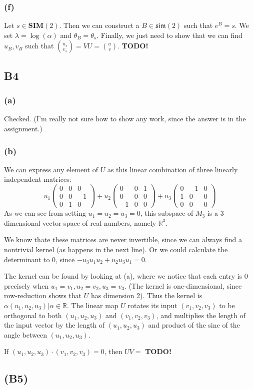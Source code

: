 \documentclass{article}
\newcommand{\reals}{\mathbb{R}}
\newcommand{\threematrix}[9]{\left(\begin{array}{ccc} #1 & #2 & #3\\ #4 & #5 & #6 \\ #7 & #8 & #9 \end{array}\right)}
\begin{document}
\subsubsection{(f)}
Let $s \in \textbf{SIM}(2)$. Then we can construct a $B \in \mathfrak{sim}(2)$ such that $e^B = s$.
We set $\lambda = \log(\alpha)$ and $\theta_B = \theta_s$.
Finally, we just need to show that we can find $u_B, v_B$ such that $ \binom{u_s}{v_s} = VU = \binom{u}{v}$.
\textbf{TODO!}

\subsection{B4}
\subsubsection{(a)} Checked. (I'm really not sure how to show any work, since the answer is in the assignment.)
\subsubsection{(b)}
We can express any element of $U$ as this linear combination of three linearly independent matrices:
\[ u_1\threematrix{0}{0}{0}{0}{0}{-1}{0}{1}{0} + 
   u_2\threematrix{0}{0}{1}{0}{0}{0} {-1}{0} {0} +
   u_3\threematrix{0}{-1}{0}{1}{0}{0}{0}{0}{0} \]
As we can see from setting $u_1 = u_2 = u_3 = 0$, this subspace of $M_3$ is a 3-dimensional vector space of real numbers, namely $\reals^3$.

We know thate these matrices are never invertible, since we can always find a nontrivial kernel (as happens in the next line).
Or we could calculate the determinant to 0, since $-u_3u_1u_2 + u_2u_3u_1 = 0$.

The kernel can be found by looking at (a), where we notice that each entry is $0$ precisely when $u_1 = v_1, u_2 = v_2, u_3 = v_3$.
(The kernel is one-dimensional, since row-reduction shows that $U$ has dimension 2).
Thus the kernel is ${\alpha(u_1, u_2, u_3) | \alpha \in \reals}$.
The linear map $U$ rotates its input $(v_1, v_2, v_3)$ to be orthogonal to both $(u_1, u_2, u_3)$ and $(v_1, v_2, v_3)$, and multiplies the length of the input vector by the length of $(u_1, u_2, u_3)$ and product of the sine of the angle between $(u_1, u_2, u_3)$.

If $(u_1, u_2, u_3) \cdot (v_1, v_2, v_3) = 0$, then $UV = $ \textbf{TODO!}

\subsection{(B5)}
\end{document}
